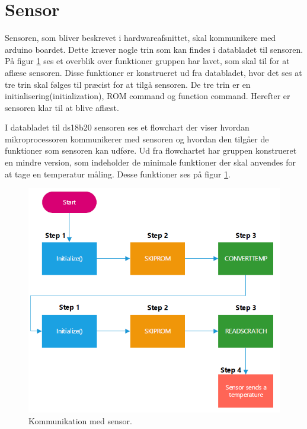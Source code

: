 \newpage
\section{Sensor}
Sensoren, som bliver beskrevet i hardwareafsnittet, skal kommunikere med arduino boardet. Dette kræver nogle trin som kan findes i databladet til sensoren. På figur \ref{sensor_min} ses et overblik over funktioner gruppen har lavet, som skal til for at aflæse sensoren. Disse funktioner er konstrueret ud fra databladet, hvor det ses at tre trin skal følges til præcist for at tilgå sensoren. De tre trin er en initialisering(initialization), ROM command og function command. Herefter er sensoren klar til at blive aflæst.



I databladet til ds18b20 sensoren ses et flowchart der viser hvordan mikroprocessoren kommunikerer med sensoren og hvordan den tilgåer de funktioner som sensoren kan udføre. Ud fra flowchartet har gruppen konstrueret en mindre version, som indeholder de minimale funktioner der skal anvendes for at tage en temperatur måling. Desse funktioner ses på figur \ref{sensor_min}.



\begin{figure}[h!]
  \centering
  \includegraphics[width=1\textwidth]{figures/sensor_minimum.png}
  \caption{Kommunikation med sensor.}
  \label{sensor_min}
\end{figure}

